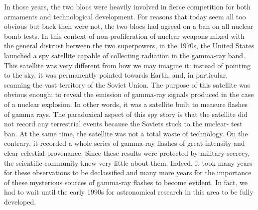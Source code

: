 In those years, the two blocs were heavily involved in fierce competition for both
armaments and technological development. For reasons that today seem all too obvious but
back then were not, the two blocs had agreed on a ban on all nuclear bomb tests. In this
context of non-proliferation of nuclear weapons mixed with the general distrust between
the two superpowers, in the 1970s, the United States launched a spy satellite capable of
collecting radiation in the gamma-ray band. This satellite was very different from how
we may imagine it: instead of pointing to the sky, it was permanently pointed towards
Earth, and, in particular, scanning the vast territory of the Soviet Union. The purpose
of this satellite was obvious enough: to reveal the emission of gamma-ray signals
produced in the case of a nuclear explosion. In other words, it was a satellite built to
measure flashes of gamma rays. The paradoxical aspect of this spy story is that the
satellite did not record any terrestrial events because the Soviets stuck to the
nuclear- test ban. At the same time, the satellite was not a total waste of technology.
On the contrary, it recorded a whole series of gamma-ray flashes of great intensity and
clear celestial provenance. Since these results were protected by military secrecy, the
scientific community knew very little about them. Indeed, it took many years for these
observations to be declassified and many more years for the importance of these
mysterious sources of gamma-ray flashes to become evident. In fact, we had to wait until
the early 1990s for astronomical research in this area to be fully developed.

